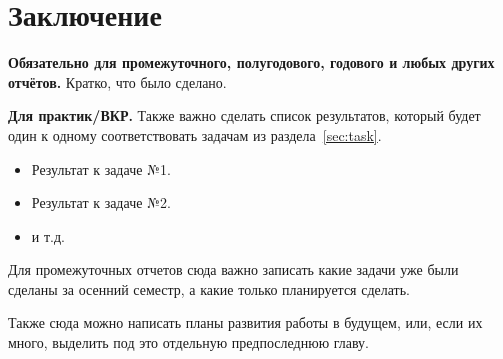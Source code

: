
\section*{Заключение}
\textbf{Обязательно для промежуточного, полугодового, годового и  любых других отчётов.} Кратко, что было сделано.

\textbf{Для практик/ВКР.} Также важно сделать список результатов, который будет один к одному соответствовать задачам из раздела~\ref{sec:task}.

\begin{itemize}
\item Результат к задаче №1.
\item Результат к задаче №2.
\item и т.д.
\end{itemize}
\noindent Для промежуточных отчетов сюда важно записать какие задачи уже были сделаны за осенний семестр, а какие только планируется сделать.

Также сюда можно написать планы развития работы в будущем, или, если их много, выделить под это отдельную предпоследнюю главу.

